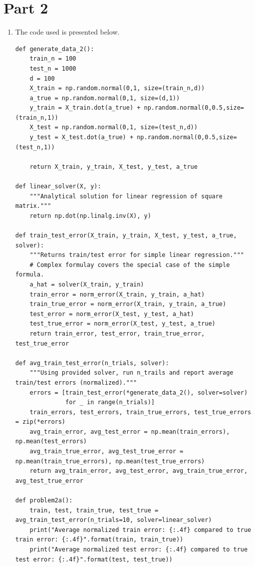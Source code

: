 \documentclass[12pt]{article}
\begin{document}
\newpage
\section*{Part 2}
\begin{enumerate}[label=(\alph*)]
  \item

    The code used is presented below.
    \begin{verbatim}
def generate_data_2():
    train_n = 100
    test_n = 1000
    d = 100
    X_train = np.random.normal(0,1, size=(train_n,d))
    a_true = np.random.normal(0,1, size=(d,1))
    y_train = X_train.dot(a_true) + np.random.normal(0,0.5,size=(train_n,1))
    X_test = np.random.normal(0,1, size=(test_n,d))
    y_test = X_test.dot(a_true) + np.random.normal(0,0.5,size=(test_n,1))
    
    return X_train, y_train, X_test, y_test, a_true

def linear_solver(X, y):
    """Analytical solution for linear regression of square matrix."""
    return np.dot(np.linalg.inv(X), y)

def train_test_error(X_train, y_train, X_test, y_test, a_true, solver):
    """Returns train/test error for simple linear regression."""
    # Complex formulay covers the special case of the simple formula.
    a_hat = solver(X_train, y_train)
    train_error = norm_error(X_train, y_train, a_hat)
    train_true_error = norm_error(X_train, y_train, a_true)
    test_error = norm_error(X_test, y_test, a_hat)
    test_true_error = norm_error(X_test, y_test, a_true)
    return train_error, test_error, train_true_error, test_true_error

def avg_train_test_error(n_trials, solver):
    """Using provided solver, run n_trails and report average train/test errors (normalized)."""
    errors = [train_test_error(*generate_data_2(), solver=solver)
              for _ in range(n_trials)]
    train_errors, test_errors, train_true_errors, test_true_errors = zip(*errors)
    avg_train_error, avg_test_error = np.mean(train_errors), np.mean(test_errors)
    avg_train_true_error, avg_test_true_error = np.mean(train_true_errors), np.mean(test_true_errors)
    return avg_train_error, avg_test_error, avg_train_true_error, avg_test_true_error

def problem2a():
    train, test, train_true, test_true = avg_train_test_error(n_trials=10, solver=linear_solver)
    print("Average normalized train error: {:.4f} compared to true train error: {:.4f}".format(train, train_true))
    print("Average normalized test error: {:.4f} compared to true test error: {:.4f}".format(test, test_true))


\end{verbatim}
\end{enumerate}
\end{document}
